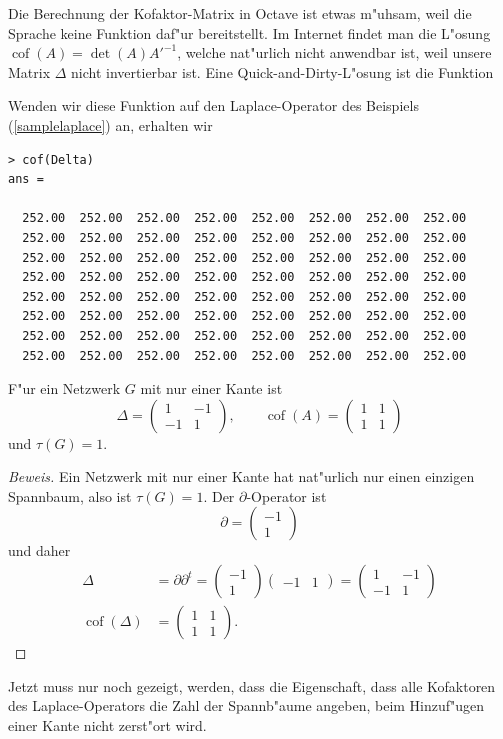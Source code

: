 \begin{beispiel}
Die Berechnung der Kofaktor-Matrix in Octave ist etwas m"uhsam, weil
die Sprache keine Funktion daf"ur bereitstellt.
Im Internet findet man die L"osung $\operatorname{cof}(A)=\det(A)A'^{-1}$,
welche nat"urlich nicht anwendbar ist, weil unsere Matrix $\Delta$
nicht invertierbar ist.
Eine Quick-and-Dirty-L"osung
ist die Funktion

Wenden wir diese Funktion auf den Laplace-Operator des Beispiels
(\ref{samplelaplace}) an, erhalten wir
{\small
\begin{verbatim}
> cof(Delta)
ans =

  252.00  252.00  252.00  252.00  252.00  252.00  252.00  252.00
  252.00  252.00  252.00  252.00  252.00  252.00  252.00  252.00
  252.00  252.00  252.00  252.00  252.00  252.00  252.00  252.00
  252.00  252.00  252.00  252.00  252.00  252.00  252.00  252.00
  252.00  252.00  252.00  252.00  252.00  252.00  252.00  252.00
  252.00  252.00  252.00  252.00  252.00  252.00  252.00  252.00
  252.00  252.00  252.00  252.00  252.00  252.00  252.00  252.00
  252.00  252.00  252.00  252.00  252.00  252.00  252.00  252.00
\end{verbatim}
}
\end{beispiel}

\begin{hilfssatz}
\label{matrixtreetheorem1}
F"ur ein Netzwerk $G$ mit nur einer Kante ist
\[
\Delta=\begin{pmatrix}
1&-1\\-1&1
\end{pmatrix},
\qquad
\operatorname{cof}(A)=\begin{pmatrix}1&1\\1&1\end{pmatrix}
\]
und
$\tau(G)=1$.
\end{hilfssatz}

\begin{proof}[Beweis]
Ein Netzwerk mit nur einer Kante hat nat"urlich nur einen einzigen
Spannbaum, also ist $\tau(G)=1$. Der $\partial$-Operator ist
\[
\partial=\begin{pmatrix}-1\\1\end{pmatrix}
\]
und daher
\begin{align*}
\Delta&=
\partial\partial^t=
\begin{pmatrix}-1\\1\end{pmatrix}
\begin{pmatrix}-1&1\end{pmatrix}
=
\begin{pmatrix}
1&-1\\
-1&1
\end{pmatrix}
\\
\operatorname{cof}(\Delta)&=\begin{pmatrix}1&1\\1&1\end{pmatrix}.
\end{align*}
\end{proof}
Jetzt muss nur noch gezeigt, werden, dass die Eigenschaft, dass alle
Kofaktoren des Laplace-Operators die Zahl der Spannb"aume angeben,
beim Hinzuf"ugen einer Kante nicht zerst"ort wird.

